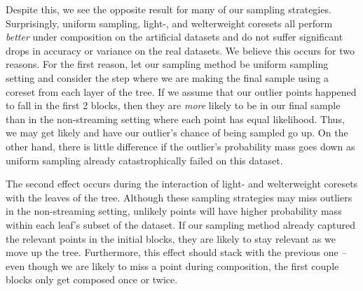 Despite this, we see the opposite result for many of our sampling strategies. Surprisingly, uniform sampling, light-, and welterweight coresets all perform
\emph{better} under composition on the artificial datasets and do not suffer significant drops in accuracy or variance on the real datasets. We believe this
occurs for two reasons. For the first reason, let our sampling method be uniform sampling setting and consider the step where we are making the final sample
using a coreset from each layer of the tree. If we assume that our outlier points happened to fall in the first 2 blocks, then they are \emph{more} likely to be
in our final sample than in the non-streaming setting where each point has equal likelihood. Thus, we may get likely and have our outlier's chance of being
sampled go up. On the other hand, there is little difference if the outlier's probability mass goes down as uniform sampling already catastrophically failed
on this dataset.

The second effect occurs during the interaction of light- and welterweight coresets with the leaves of the tree. Although these sampling strategies may miss
outliers in the non-streaming setting, unlikely points will have higher probability mass within each leaf's subset of the dataset. If our sampling method
already captured the relevant points in the initial blocks, they are likely to stay relevant as we move up the tree. Furthermore, this effect should stack with
the previous one -- even though we are likely to miss a point during composition, the first couple blocks only get composed once or twice.


